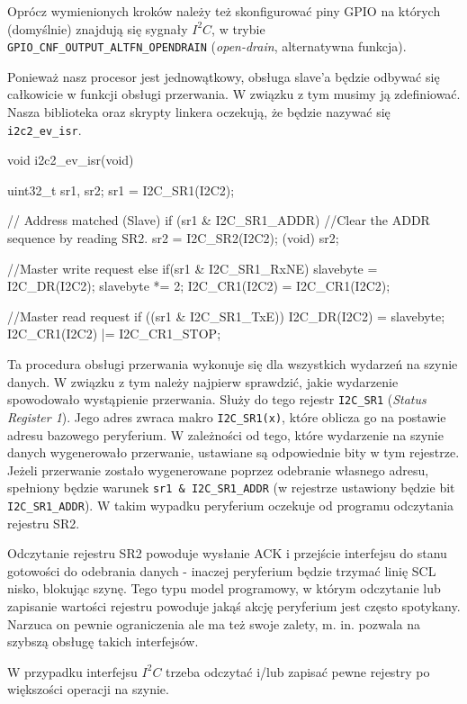 \documentclass{pdfBooklets}
\begin{document}
Oprócz wymienionych kroków należy też skonfigurować piny GPIO na których (domyślnie) znajdują się sygnały $I^2C$, w trybie
\Verb$GPIO_CNF_OUTPUT_ALTFN_OPENDRAIN$ (\textit{open-drain}, alternatywna funkcja).

Ponieważ nasz procesor jest jednowątkowy, obsługa slave'a będzie odbywać się całkowicie w funkcji obsługi przerwania. W związku z tym musimy ją
zdefiniować. Nasza biblioteka oraz skrypty linkera oczekują, że będzie nazywać się \Verb$i2c2_ev_isr$.

\begin{CodeFrame*}[c]{}
void i2c2_ev_isr(void){
  
  uint32_t sr1, sr2;
  sr1 = I2C_SR1(I2C2);

  // Address matched (Slave)
  if (sr1 & I2C_SR1_ADDR){
    //Clear the ADDR sequence by reading SR2.
    sr2 = I2C_SR2(I2C2);
    (void) sr2;	
  }

  //Master write request
  else if(sr1 & I2C_SR1_RxNE){
    slavebyte = I2C_DR(I2C2);
    slavebyte *= 2;
    I2C_CR1(I2C2) = I2C_CR1(I2C2);
  }
  
  //Master read request
  if ((sr1 & I2C_SR1_TxE)){
    I2C_DR(I2C2) = slavebyte;
    I2C_CR1(I2C2) |= I2C_CR1_STOP;
  }
}
\end{CodeFrame*}

Ta procedura obsługi przerwania wykonuje się dla wszystkich wydarzeń na szynie danych. W związku z tym należy najpierw sprawdzić, jakie wydarzenie
spowodowało wystąpienie przerwania. Służy do tego rejestr \Verb$I2C_SR1$ (\textit{Status Register 1}). Jego adres zwraca makro \Verb$I2C_SR1(x)$,
które oblicza go na postawie adresu bazowego peryferium. W zależności od tego, które wydarzenie na szynie danych wygenerowało przerwanie, ustawiane
są odpowiednie bity w tym rejestrze.\\

Jeżeli przerwanie zostało wygenerowane poprzez odebranie własnego adresu, spełniony będzie warunek \Verb$sr1 & I2C_SR1_ADDR$ (w rejestrze ustawiony
będzie bit \Verb$I2C_SR1_ADDR$). W takim wypadku peryferium oczekuje od programu odczytania rejestru SR2.

\begin{ProTip}{}
Odczytanie rejestru SR2 powoduje wysłanie ACK i przejście interfejsu do stanu gotowości do odebrania danych - inaczej peryferium będzie
trzymać linię SCL nisko, blokując szynę. Tego typu model programowy, w którym odczytanie lub zapisanie wartości rejestru powoduje
jakąś akcję peryferium jest często spotykany. Narzuca on pewnie ograniczenia ale ma też swoje zalety, m. in. pozwala na szybszą obsługę takich
interfejsów.

W przypadku interfejsu $I^2C$ trzeba odczytać i/lub zapisać pewne rejestry po większości operacji na szynie.
\end{ProTip}
\end{document}
